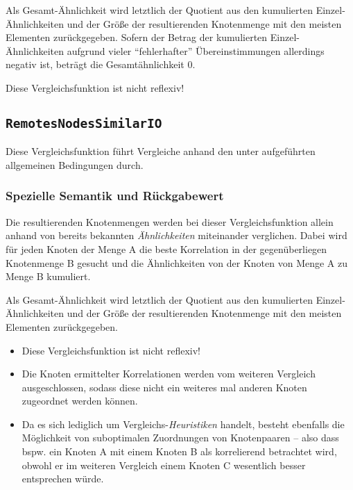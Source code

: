 Als Gesamt-Ähnlichkeit wird letztlich der Quotient aus den kumulierten Einzel-Ähnlichkeiten und der Größe der resultierenden Knotenmenge mit den meisten Elementen zurückgegeben. Sofern der Betrag der kumulierten Einzel-Ähnlichkeiten aufgrund vieler "`fehlerhafter"' Übereinstimmungen allerdings negativ ist, beträgt die Gesamtähnlichkeit $0$.

 Diese Vergleichsfunktion ist nicht reflexiv!


\newpage
%
%
\subsection{\texttt{RemotesNodesSimilarIO}}
Diese Vergleichsfunktion führt Vergleiche anhand den unter  aufgeführten allgemeinen Bedingungen durch.

\subsubsection*{Spezielle Semantik und Rückgabewert}
Die resultierenden Knotenmengen werden bei dieser Vergleichsfunktion allein anhand von bereits bekannten \emph{Ähnlichkeiten} miteinander verglichen. Dabei wird für jeden Knoten der Menge A die beste Korrelation in der gegenüberliegen Knotenmenge B gesucht und die Ähnlichkeiten von der Knoten von Menge A zu Menge B kumuliert.

Als Gesamt-Ähnlichkeit wird letztlich der Quotient aus den kumulierten Einzel-Ähnlichkeiten und der Größe der resultierenden Knotenmenge mit den meisten Elementen zurückgegeben.

\begin{itemize}
	\item Diese Vergleichsfunktion ist nicht reflexiv!
	\item Die Knoten ermittelter Korrelationen werden vom weiteren Vergleich ausgeschlossen, sodass diese nicht ein weiteres mal anderen Knoten zugeordnet werden können.
	\item Da es sich lediglich um Vergleichs-\emph{Heuristiken} handelt, besteht ebenfalls die Möglichkeit von suboptimalen Zuordnungen von Knotenpaaren -- also dass bspw. ein Knoten A mit einem Knoten B als korrelierend betrachtet wird, obwohl er im weiteren Vergleich einem Knoten C wesentlich besser entsprechen würde.
\end{itemize}


%
%
